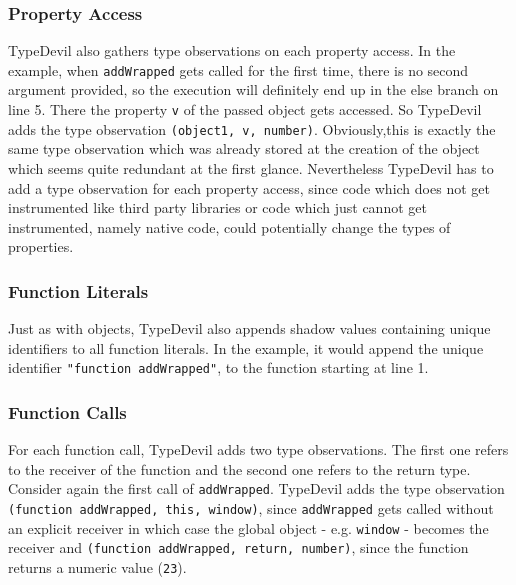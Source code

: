 \documentclass[runningheads,a4paper]{llncs}
\begin{document}
\subsubsection{Property Access}
TypeDevil also gathers type observations on each property access.
In the example, when \lstinline[columns=fixed]{addWrapped} gets called for the first time, there is no second argument provided, so the execution will definitely end up in the else branch on line 5. 
There the property \lstinline[columns=fixed]{v} of the passed object gets accessed.
So TypeDevil adds the type observation \lstinline[columns=fixed]{(object1, v, number)}.
Obviously,this is exactly the same type observation which was already stored at the creation of the object which seems quite redundant at the first glance. 
Nevertheless TypeDevil has to add a type observation for each property access, since code which does not get instrumented like third party libraries or code which just cannot get instrumented, namely native code, could potentially change the types of properties.

\subsubsection{Function Literals}
Just as with objects, TypeDevil also appends shadow values containing unique identifiers to all function literals.
In the example, it would append the unique identifier \lstinline[columns=fixed]{"function addWrapped"}, to the function starting at line 1.

\subsubsection{Function Calls}
For each function call, TypeDevil adds two type observations.
The first one refers to the receiver of the function and the second one refers to the return type.
Consider again the first call of \lstinline[columns=fixed]{addWrapped}.
TypeDevil adds the type observation \lstinline[columns=fixed]{(function addWrapped, this, window)}, since \lstinline[columns=fixed]{addWrapped} gets called without an explicit receiver in which case the global object - e.g. \lstinline[columns=fixed]{window} - becomes the receiver
and \lstinline[columns=fixed]{(function addWrapped, return, number)}, since the function returns a numeric value (\lstinline[columns=fixed]{23}).
\end{document}
